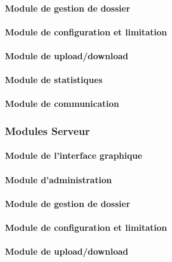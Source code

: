 \documentclass[10pt,a4paper]{report}
\begin{document}
	
	\paragraph{Module de gestion de dossier}
	
	
	\paragraph{Module de configuration et limitation}	
	
	
	\paragraph{Module de upload/download}
	
	
	\paragraph{Module de statistiques}
	
	
	\paragraph{Module de communication}


\subsubsection{Modules Serveur}

	\paragraph{Module de l'interface graphique}
	
	
	\paragraph{Module d'administration}
	
	
	\paragraph{Module de gestion de dossier}
	
	
	\paragraph{Module de configuration et limitation}	
	
	
	\paragraph{Module de upload/download}
	
\end{document}
